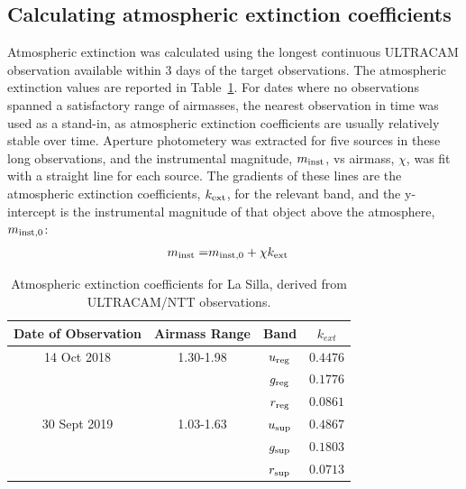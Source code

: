 \subsection{Calculating atmospheric extinction coefficients}
\label{sect:calcualting atmospheric extinction}

Atmospheric extinction was calculated using the longest continuous ULTRACAM observation available within 3 days of the target observations.
The atmospheric extinction values are reported in Table~\ref{table:atmos_extinction}.
For dates where no observations spanned a satisfactory range of airmasses, the nearest observation in time was used as a stand-in, as atmospheric extinction coefficients are usually relatively stable over time.
Aperture photometery was extracted for five sources in these long observations, and the instrumental magnitude, $m_{\rm inst}$, vs airmass, $\chi$, was fit with a straight line for each source. 
The gradients of these lines are the atmospheric extinction coefficients, $k_{\rm ext}$, for the relevant band, and the y-intercept is the instrumental magnitude of that object above the atmosphere, $m_{\rm inst,0}$:
\begin{align*}
    m_{\rm inst} =& m_{\rm inst,0} + \chi k_{\rm ext} 
\end{align*}

\begin{table}
    \centering
    \caption{Atmospheric extinction coefficients for La Silla, derived from ULTRACAM/NTT observations.}
    \label{table:atmos_extinction}
    \begin{tabular}{cccc}
        \hline
        Date of Observation & Airmass Range & Band & $k_{ext}$ \\
        \hline
        \hline
        14 Oct 2018   & 1.30-1.98 & $u_{\rm reg}$ & $0.4476$ \\
                      &           & $g_{\rm reg}$ & $0.1776$ \\
                      &           & $r_{\rm reg}$ & $0.0861$ \\
        \hline
        30 Sept 2019  & 1.03-1.63 & $u_{\rm sup}$ & $0.4867$ \\
                      &           & $g_{\rm sup}$ & $0.1803$ \\
                      &           & $r_{\rm sup}$ & $0.0713$ \\
        \hline
    \end{tabular}
\end{table}


